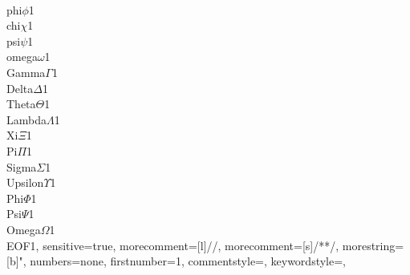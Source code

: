 {	{\\phi}{$\phi$}1
	{\\chi}{$\chi$}1
	{\\psi}{$\psi$}1
	{\\omega}{$\omega$}1
	{\\Gamma}{$\Gamma$}1
	{\\Delta}{$\Delta$}1
	{\\Theta}{$\Theta$}1
	{\\Lambda}{$\Lambda$}1
	{\\Xi}{$\Xi$}1
	{\\Pi}{$\Pi$}1
	{\\Sigma}{$\Sigma$}1
	{\\Upsilon}{$\Upsilon$}1
	{\\Phi}{$\Phi$}1
	{\\Psi}{$\Psi$}1
	{\\Omega}{$\Omega$}1
	{\\EOF}{\;}1,
	sensitive=true,
	morecomment=[l]//,%
	morecomment=[s]{/*}{*/},%
	morestring=[b]",
	numbers=none,
	firstnumber=1,
	commentstyle=\color{pgreen},
	keywordstyle=\color{pblue},
}

 {}
